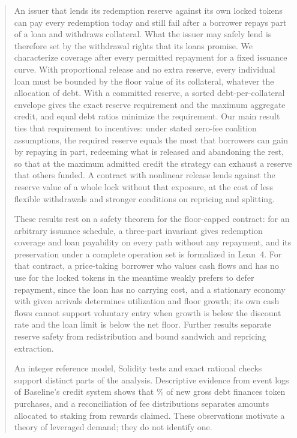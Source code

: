 \begin{abstract}
\noindent
An issuer that lends its redemption reserve against its own locked tokens can pay every redemption today and still fail after a borrower repays part of a loan and withdraws collateral. What the issuer may safely lend is therefore set by the withdrawal rights that its loans promise. We characterize coverage after every permitted repayment for a fixed issuance curve. With proportional release and no extra reserve, every individual loan must be bounded by the floor value of its collateral, whatever the allocation of debt. With a committed reserve, a sorted debt-per-collateral envelope gives the exact reserve requirement and the maximum aggregate credit, and equal debt ratios minimize the requirement. Our main result ties that requirement to incentives: under stated zero-fee coalition assumptions, the required reserve equals the most that borrowers can gain by repaying in part, redeeming what is released and abandoning the rest, so that at the maximum admitted credit the strategy can exhaust a reserve that others funded. A contract with nonlinear release lends against the reserve value of a whole lock without that exposure, at the cost of less flexible withdrawals and stronger conditions on repricing and splitting.

These results rest on a safety theorem for the floor-capped contract: for an arbitrary issuance schedule, a three-part invariant gives redemption coverage and loan payability on every path without any repayment, and its preservation under a complete operation set is formalized in Lean~4. For that contract, a price-taking borrower who values cash flows and has no use for the locked tokens in the meantime weakly prefers to defer repayment, since the loan has no carrying cost, and a stationary economy with given arrivals determines utilization and floor growth; its own cash flows cannot support voluntary entry when growth is below the discount rate and the loan limit is below the net floor. Further results separate reserve safety from redistribution and bound sandwich and repricing extraction.

An integer reference model, Solidity tests and exact rational checks support distinct parts of the analysis. Descriptive evidence from \ELogs{} event logs of Baseline's credit system shows that \ELeverAmtPct\% of new gross debt finances token purchases, and a reconciliation of fee distributions separates amounts allocated to staking from rewards claimed. These observations motivate a theory of leveraged demand; they do not identify one.
\end{abstract}
